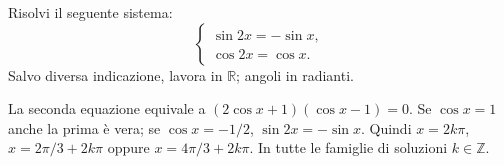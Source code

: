 
\begin{esercizio}
Risolvi il seguente sistema: 
\[
\begin{cases}
\sin 2x=-\sin x,\\[2mm]
\cos 2x=\cos x.
\end{cases}
\]
Salvo diversa indicazione, lavora in $\mathbb R$; angoli in radianti.
\end{esercizio}

\begin{soluzione}
La seconda equazione equivale a $(2\cos x+1)(\cos x-1)=0$.
Se $\cos x=1$ anche la prima è vera; se $\cos x=-1/2$, $\sin2x=-\sin x$.
Quindi $x=2k\pi$, $x=2\pi/3+2k\pi$ oppure $x=4\pi/3+2k\pi$. In tutte le famiglie di soluzioni $k\in\mathbb{Z}$.
\end{soluzione}
